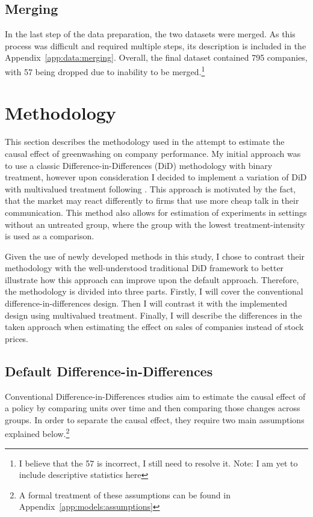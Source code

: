 \documentclass[12pt]{article}
\begin{document}
\subsection{Merging}

In the last step of the data preparation, the two datasets were merged. As this process was difficult and required multiple steps, its description is included in the Appendix~\ref{app:data:merging}. Overall, the final dataset contained 795 companies, with 57 being dropped due to inability to be merged.\footnote{I believe that the 57 is incorrect, I still need to resolve it. Note: I am yet to include descriptive statistics here}


\section{Methodology}\label{sect:methodology}

This section describes the methodology used in the attempt to estimate the causal effect of greenwashing on company performance.
My initial approach was to use a classic Difference-in-Differences (DiD) methodology with binary treatment, however upon consideration I decided to implement a variation of DiD with multivalued treatment following \textcite{callawayDifferenceinDifferencesContinuousTreatment2025}. This approach is motivated by the fact, that the market may react differently to firms that use more cheap talk in their communication. This method also allows for estimation of experiments in settings without an untreated group, where the group with the lowest treatment-intensity is used as a comparison. 

Given the use of newly developed methods in this study, I chose to contrast their methodology with the well-understood traditional DiD framework to better illustrate how this approach can improve upon the default approach. Therefore, the methodology is divided into three parts. Firstly, I will cover the conventional difference-in-differences design. Then I will contrast it with the implemented design using multivalued treatment. Finally, I will describe the differences in the taken approach when estimating the effect on sales of companies instead of stock prices.


\subsection{Default Difference-in-Differences}

Conventional Difference-in-Differences studies aim to estimate the causal effect of a policy by comparing units over time and then comparing those changes across groups. In order to separate the causal effect, they require two main assumptions explained below.\footnote{A formal treatment of these assumptions can be found in Appendix~\ref{app:models:assumptions}} 
\end{document}
